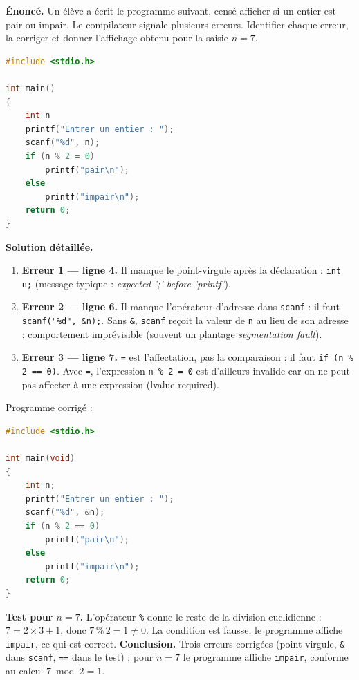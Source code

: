 \documentclass[11pt]{article}
\begin{document}
\begin{exoresolu}
\textbf{Énoncé.} Un élève a écrit le programme suivant, censé afficher si un entier est pair ou impair. Le compilateur signale plusieurs erreurs. Identifier chaque erreur, la corriger et donner l'affichage obtenu pour la saisie $n = 7$.
\begin{lstlisting}[language=C]
#include <stdio.h>

int main()
{
    int n
    printf("Entrer un entier : ");
    scanf("%d", n);
    if (n % 2 = 0)
        printf("pair\n");
    else
        printf("impair\n");
    return 0;
}
\end{lstlisting}
\tcblower
\textbf{Solution détaillée.}
\begin{enumerate}
\item \textbf{Erreur 1 — ligne 4.} Il manque le point-virgule après la déclaration : \texttt{int n;} (message typique : \emph{expected ';' before 'printf'}).
\item \textbf{Erreur 2 — ligne 6.} Il manque l'opérateur d'adresse dans \texttt{scanf} : il faut \texttt{scanf("\%d", \&n);}. Sans \texttt{\&}, \texttt{scanf} reçoit la valeur de \texttt{n} au lieu de son adresse : comportement imprévisible (souvent un plantage \emph{segmentation fault}).
\item \textbf{Erreur 3 — ligne 7.} \texttt{=} est l'affectation, pas la comparaison : il faut \texttt{if (n \% 2 == 0)}. Avec \texttt{=}, l'expression \texttt{n \% 2 = 0} est d'ailleurs invalide car on ne peut pas affecter à une expression (lvalue required).
\end{enumerate}
Programme corrigé :
\begin{lstlisting}[language=C]
#include <stdio.h>

int main(void)
{
    int n;
    printf("Entrer un entier : ");
    scanf("%d", &n);
    if (n % 2 == 0)
        printf("pair\n");
    else
        printf("impair\n");
    return 0;
}
\end{lstlisting}
\textbf{Test pour $n = 7$.} L'opérateur \texttt{\%} donne le reste de la division euclidienne : $7 = 2 \times 3 + 1$, donc $7 \,\%\, 2 = 1 \neq 0$. La condition est fausse, le programme affiche \texttt{impair}, ce qui est correct.
\textbf{Conclusion.} Trois erreurs corrigées (point-virgule, \texttt{\&} dans \texttt{scanf}, \texttt{==} dans le test) ; pour $n = 7$ le programme affiche \texttt{impair}, conforme au calcul $7 \bmod 2 = 1$.
\end{exoresolu}
\end{document}
